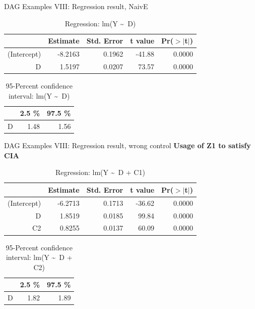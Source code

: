 \documentclass{beamer}\usepackage[]{graphicx}\usepackage[]{color}
\begin{document}
\begin{frame}[fragile]{DAG Examples VIII: Regression result, NaivE}
\begin{table}[ht]
\centering
\begingroup\small
\begin{tabular}{rrrrr}
  \hline
 & Estimate & Std. Error & t value & Pr($>$$|$t$|$) \\ 
  \hline
(Intercept) & -8.2163 & 0.1962 & -41.88 & 0.0000 \\ 
  D & 1.5197 & 0.0207 & 73.57 & 0.0000 \\ 
   \hline
\end{tabular}
\endgroup
\caption{Regression: lm(Y \textasciitilde ~D)} 
\end{table}
\begin{table}[ht]
\centering
\begingroup\small
\begin{tabular}{rrr}
  \hline
 & 2.5 \% & 97.5 \% \\ 
  \hline
D & 1.48 & 1.56 \\ 
   \hline
\end{tabular}
\endgroup
\caption{95-Percent confidence interval: lm(Y \textasciitilde ~D)} 
\end{table}

\end{frame}

\begin{frame}[fragile]{DAG Examples VIII: Regression result, wrong control}
\textbf{Usage of Z1 to satisfy CIA}
\begin{table}[ht]
\centering
\begingroup\small
\begin{tabular}{rrrrr}
  \hline
 & Estimate & Std. Error & t value & Pr($>$$|$t$|$) \\ 
  \hline
(Intercept) & -6.2713 & 0.1713 & -36.62 & 0.0000 \\ 
  D & 1.8519 & 0.0185 & 99.84 & 0.0000 \\ 
  C2 & 0.8255 & 0.0137 & 60.09 & 0.0000 \\ 
   \hline
\end{tabular}
\endgroup
\caption{Regression: lm(Y \textasciitilde ~D + C1)} 
\end{table}
\begin{table}[ht]
\centering
\begingroup\small
\begin{tabular}{rrr}
  \hline
 & 2.5 \% & 97.5 \% \\ 
  \hline
D & 1.82 & 1.89 \\ 
   \hline
\end{tabular}
\endgroup
\caption{95-Percent confidence interval: lm(Y \textasciitilde ~D + C2)} 
\end{table}

\end{frame}
\end{document}
